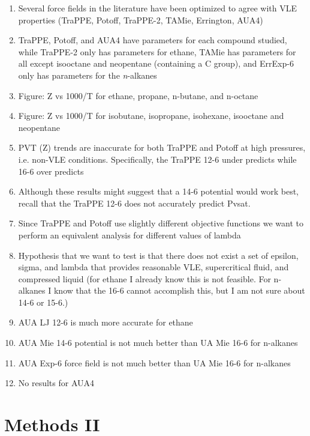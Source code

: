\documentclass[preprint,letterpaper,floatfix,citeautoscript,aip,jcp]{revtex4-1}
\begin{document}
\begin{enumerate}
	\item Several force fields in the literature have been optimized to agree with VLE properties (TraPPE, Potoff, TraPPE-2, TAMie, Errington, AUA4)
	\item TraPPE, Potoff, and AUA4 have parameters for each compound studied, while TraPPE-2 only has parameters for ethane, TAMie has parameters for all except isooctane and neopentane (containing a C group), and ErrExp-6 only has parameters for the \textit{n}-alkanes
	\item Figure: Z vs 1000/T for ethane, propane, n-butane, and n-octane
	\item Figure: Z vs 1000/T for isobutane, isopropane, isohexane, isooctane and neopentane 
	\item PVT (Z) trends are inaccurate for both TraPPE and Potoff at high pressures, i.e. non-VLE conditions. Specifically, the TraPPE 12-6 under predicts while 16-6 over predicts
	\item Although these results might suggest that a 14-6 potential would work best, recall that the TraPPE 12-6 does not accurately predict Pvsat. 
	\item Since TraPPE and Potoff use slightly different objective functions we want to perform an equivalent analysis for different values of lambda
	\item Hypothesis that we want to test is that there does not exist a set of epsilon, sigma, and lambda that provides reasonable VLE, supercritical fluid, and compressed liquid (for ethane I already know this is not feasible. For n-alkanes I know that the 16-6 cannot accomplish this, but I am not sure about 14-6 or 15-6.)
	\item AUA LJ 12-6 is much more accurate for ethane
	\item AUA Mie 14-6 potential is not much better than UA Mie 16-6 for n-alkanes
	\item AUA Exp-6 force field is not much better than UA Mie 16-6 for n-alkanes
	\item No results for AUA4
\end{enumerate}

\section{Methods II}
\end{document}
